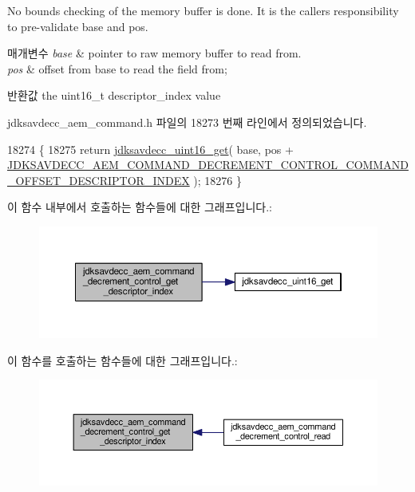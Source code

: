 No bounds checking of the memory buffer is done. It is the caller\textquotesingle{}s responsibility to pre-\/validate base and pos.


\begin{DoxyParams}{매개변수}
{\em base} & pointer to raw memory buffer to read from. \\
\hline
{\em pos} & offset from base to read the field from; \\
\hline
\end{DoxyParams}
\begin{DoxyReturn}{반환값}
the uint16\+\_\+t descriptor\+\_\+index value 
\end{DoxyReturn}


jdksavdecc\+\_\+aem\+\_\+command.\+h 파일의 18273 번째 라인에서 정의되었습니다.


\begin{DoxyCode}
18274 \{
18275     \textcolor{keywordflow}{return} \hyperlink{group__endian_ga3fbbbc20be954aa61e039872965b0dc9}{jdksavdecc\_uint16\_get}( base, pos + 
      \hyperlink{group__command__decrement__control_ga85d8ef4551cff2138c445b2a7d4eb6aa}{JDKSAVDECC\_AEM\_COMMAND\_DECREMENT\_CONTROL\_COMMAND\_OFFSET\_DESCRIPTOR\_INDEX}
       );
18276 \}
\end{DoxyCode}


이 함수 내부에서 호출하는 함수들에 대한 그래프입니다.\+:
\nopagebreak
\begin{figure}[H]
\begin{center}
\leavevmode
\includegraphics[width=350pt]{group__command__decrement__control_ga8c0c47c13c35b5d5eb0e34e2b7c77b72_cgraph}
\end{center}
\end{figure}




이 함수를 호출하는 함수들에 대한 그래프입니다.\+:
\nopagebreak
\begin{figure}[H]
\begin{center}
\leavevmode
\includegraphics[width=350pt]{group__command__decrement__control_ga8c0c47c13c35b5d5eb0e34e2b7c77b72_icgraph}
\end{center}
\end{figure}


